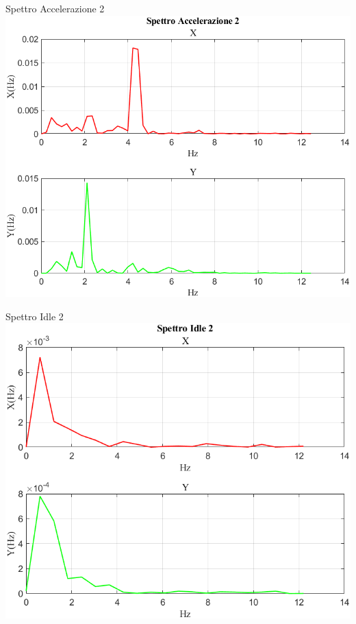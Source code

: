 \documentclass[beamer]{standalone}
\begin{document}
	\begin{frame}{{Spettro Accelerazione 2}}
		\centering\includegraphics[height=.8\textheight]{figure/Vel/Trasformata/Spettro Accelerazione 2}
	\end{frame}
	
	\begin{frame}{{Spettro Idle 2}}
		\centering\includegraphics[height=.8\textheight]{figure/Vel/Trasformata/Spettro Idle 2}
	\end{frame}
	
\end{document}

